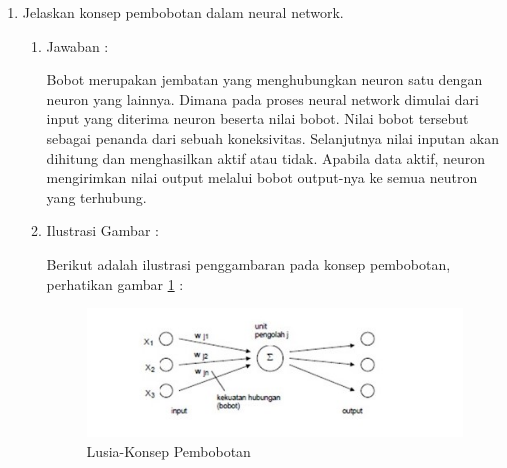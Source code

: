 \begin{enumerate}
\item Jelaskan konsep pembobotan dalam neural network.
	\begin{enumerate}
	\item Jawaban :
		\par Bobot merupakan jembatan yang menghubungkan neuron satu dengan neuron yang lainnya. Dimana pada proses neural network dimulai dari input yang diterima neuron beserta nilai bobot. Nilai bobot tersebut sebagai penanda dari sebuah koneksivitas. Selanjutnya nilai inputan akan dihitung dan menghasilkan aktif atau tidak. Apabila data aktif, neuron mengirimkan nilai output melalui bobot output-nya ke semua neutron yang terhubung. 
	\item Ilustrasi Gambar :
		\par Berikut adalah ilustrasi penggambaran pada konsep pembobotan, perhatikan gambar \ref{6A3} :
		\begin{figure}[!hbtp]
		\centering
		\includegraphics[scale=0.4]{figures/s3.jpg}
		\caption{Lusia-Konsep Pembobotan}
		\label{6A3}
		\end{figure}
	\end{enumerate}
	

\end{enumerate}
